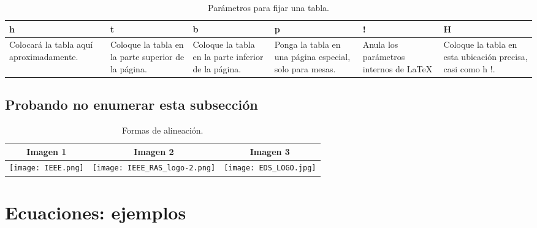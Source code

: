 \documentclass[12pt,letterpaper, onecolumn]{article}
\begin{document}
\begin{table}[H] 
\begin{center}
	\begin{tabular}{|m{2cm}|m{2cm}|m{2cm}|m{2cm}|m{2cm}|m{2cm}|}
	\hline 
	\textbf{h} & \textbf{t} & \textbf{b} & \textbf{p} & \textbf{!} & \textbf{H} \\ 
	\hline 
	Colocará la tabla aquí aproximadamente. & Coloque la tabla en la parte superior de la página. & Coloque la tabla en la parte inferior de la página. & Ponga la tabla en una página especial, solo para mesas. & Anula los parámetros internos de \LaTeX & Coloque la tabla en esta ubicación precisa, casi como h !. \\ 
	\hline 
	\end{tabular} 
\caption{Parámetros para fijar una tabla.}
\label{Tab_fijar_una_tabla}
\end{center}
\end{table}

\subsection*{Probando no enumerar esta subsección}

\begin{table}[H]
\begin{center}
    \begin{tabular}{|c|c|c|}
    \hline 
    \textbf{Imagen 1} & \textbf{Imagen 2} & \textbf{Imagen 3} \\ 
    \hline 
    \texttt{[image: IEEE.png]} & \texttt{[image: IEEE\_RAS\_logo-2.png]} & \texttt{[image: EDS\_LOGO.jpg]} \\ 
    \hline 
    \end{tabular} 
\caption{Formas de alineación.}
\label{Tab_imágenes_en_una_tabla}
\end{center}
\end{table}

\section{Ecuaciones: ejemplos}
\end{document}
